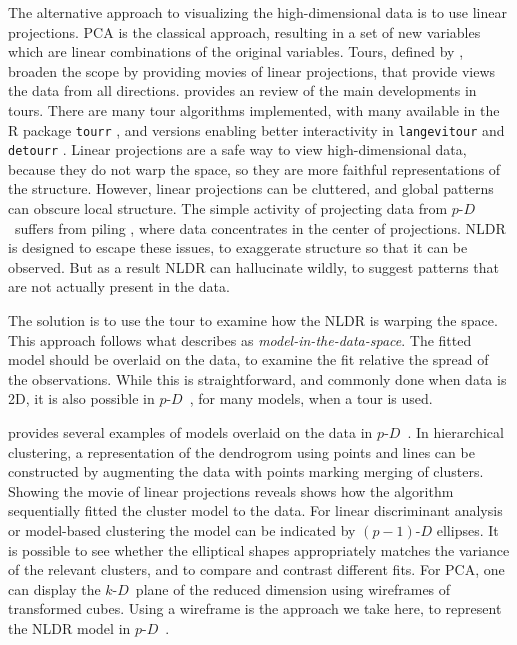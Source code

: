 \documentclass[
  12pt]{article}
\newcommand\pD{$p\text{-}D$\ }
\newcommand\kD{$k\text{-}D$\ }
\begin{document}
The alternative approach to visualizing the high-dimensional data is to
use linear projections. PCA is the classical approach, resulting in a
set of new variables which are linear combinations of the original
variables. Tours, defined by \citet{lee2021}, broaden the scope by
providing movies of linear projections, that provide views the data from
all directions. \citet{lee2021} provides an review of the main
developments in tours. There are many tour algorithms implemented, with
many available in the R package \texttt{tourr} \citep{wickham2011}, and
versions enabling better interactivity in \texttt{langevitour}
\citep{harisson2024} and \texttt{detourr} \citep{hart2022}. Linear
projections are a safe way to view high-dimensional data, because they
do not warp the space, so they are more faithful representations of the
structure. However, linear projections can be cluttered, and global
patterns can obscure local structure. The simple activity of projecting
data from \pD suffers from piling \citep{laa2022}, where data
concentrates in the center of projections. NLDR is designed to escape
these issues, to exaggerate structure so that it can be observed. But as
a result NLDR can hallucinate wildly, to suggest patterns that are not
actually present in the data.

The solution is to use the tour to examine how the NLDR is warping the
space. This approach follows what \citet{wickham2015} describes as
\emph{model-in-the-data-space}. The fitted model should be overlaid on
the data, to examine the fit relative the spread of the observations.
While this is straightforward, and commonly done when data is 2D, it is
also possible in \pD, for many models, when a tour is used.

\citet{wickham2015} provides several examples of models overlaid on the
data in \pD. In hierarchical clustering, a representation of the
dendrogrom using points and lines can be constructed by augmenting the
data with points marking merging of clusters. Showing the movie of
linear projections reveals shows how the algorithm sequentially fitted
the cluster model to the data. For linear discriminant analysis or
model-based clustering the model can be indicated by \((p-1)\text{-}D\)
ellipses. It is possible to see whether the elliptical shapes
appropriately matches the variance of the relevant clusters, and to
compare and contrast different fits. For PCA, one can display the
\kD plane of the reduced dimension using wireframes of transformed
cubes. Using a wireframe is the approach we take here, to represent the
NLDR model in \pD.
\end{document}
